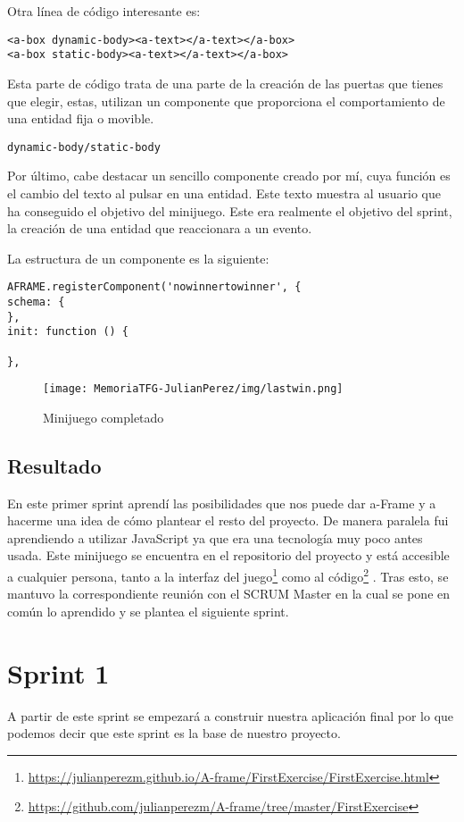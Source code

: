 \documentclass[a4paper, 12pt]{book}
\begin{document}
Otra línea de código interesante es:
\begin{verbatim}
<a-box dynamic-body><a-text></a-text></a-box>
<a-box static-body><a-text></a-text></a-box>
\end{verbatim} 

Esta parte de código  trata de una parte de la creación de las puertas que tienes que elegir, estas, utilizan un componente que proporciona el comportamiento de una entidad fija o movible.\begin{verbatim}dynamic-body/static-body \end{verbatim}

Por último, cabe destacar un sencillo componente creado por mí, cuya función es el cambio del texto al pulsar en una entidad. Este texto muestra al usuario que ha conseguido el objetivo del minijuego.  Este era realmente el objetivo del sprint, la creación de una entidad que reaccionara a un evento.

La estructura de un componente es la siguiente:
\begin{verbatim}
AFRAME.registerComponent('nowinnertowinner', {
schema: {
},
init: function () {

},
\end{verbatim} 

\begin{figure}[H]
  \centering
  \texttt{[image: MemoriaTFG-JulianPerez/img/lastwin.png]}
  \caption{Minijuego completado}\label{scrum}
\end{figure}

\subsection{Resultado}
En este primer sprint aprendí las posibilidades que nos puede dar a-Frame y a hacerme una idea de cómo plantear el resto del proyecto. De manera paralela fui aprendiendo a utilizar JavaScript ya que era una tecnología muy poco antes usada. Este minijuego se encuentra en el repositorio del proyecto y está accesible a cualquier persona, tanto a la interfaz del juego\footnote{\url{https://julianperezm.github.io/A-frame/FirstExercise/FirstExercise.html}}  como al código\footnote{\url{https://github.com/julianperezm/A-frame/tree/master/FirstExercise}} . Tras esto, se mantuvo la correspondiente reunión con el SCRUM Master en la cual se pone en común lo aprendido y se plantea el siguiente sprint.

\section{Sprint 1}
A partir de este sprint se empezará a construir nuestra aplicación final por lo que podemos decir que este sprint es la base de nuestro proyecto. 
\end{document}
